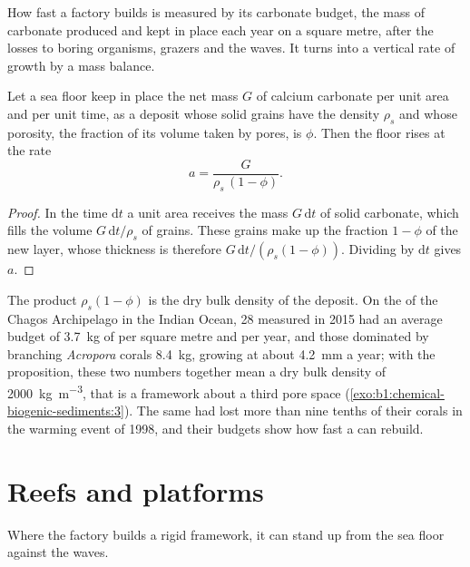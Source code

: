 How fast a factory builds is measured by its carbonate budget, the mass of
carbonate produced and kept in place each year on a square metre, after the
losses to boring organisms, grazers and the waves. It turns into a vertical
rate of growth by a mass balance.

\begin{proposition}\label{prop:b1:chemical-biogenic-sediments:accretion}
Let a sea floor keep in place the net mass $G$ of calcium carbonate per unit area
and per unit time, as a deposit whose solid grains have the density $\rho_s$
and whose porosity, the fraction of its volume taken by pores, is $\phi$. Then
the floor rises at the rate
\[
a = \frac{G}{\rho_s\,(1-\phi)}.
\]
\end{proposition}

\begin{proof}
In the time $\mathrm dt$ a unit area receives the mass $G\,\mathrm dt$ of
solid carbonate, which fills the volume $G\,\mathrm dt/\rho_s$ of grains. These
grains make up the fraction $1-\phi$ of the new layer, whose thickness is
therefore $G\,\mathrm dt/(\rho_s(1-\phi))$. Dividing by $\mathrm dt$ gives $a$.
\end{proof}

The product $\rho_s(1-\phi)$ is the dry bulk density of the deposit. On the
 of the Chagos Archipelago in the Indian Ocean, 28  measured in 2015
had an average budget of \qty{3.7}{kg} of  per square metre and per
year, and those dominated by branching \emph{Acropora} corals \qty{8.4}{kg},
growing at about \qty{4.2}{mm} a year; with the proposition, these two numbers
together mean a dry bulk density of \qty{2000}{kg.m^{-3}}, that is a 
framework about a third pore space (\cref{exo:b1:chemical-biogenic-sediments:3}).
The same  had lost more than nine tenths of their corals in the warming
event of 1998, and their budgets show how fast a  can rebuild.

\section{Reefs and platforms}\label{sec:b1:chemical-biogenic-sediments:reefs}

Where the factory builds a rigid framework, it can stand up from the sea floor
against the waves.


